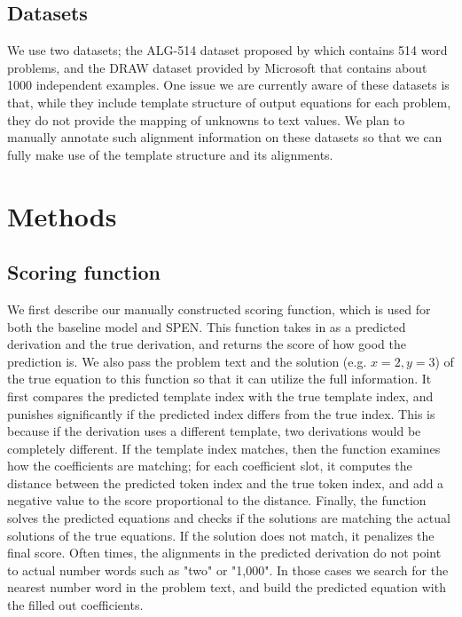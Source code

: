 \documentclass[11pt,letterpaper]{article}
\begin{document}
\subsection{Datasets}
We use two datasets; the ALG-514 dataset proposed by \cite{Kushman2014LearningTA} which contains 514 word problems, and the DRAW dataset provided by Microsoft that contains about 1000 independent examples. One issue we are currently aware of these datasets is that, while they include template structure of output equations for each problem, they do not provide the mapping of unknowns to text values. We plan to manually annotate such alignment information on these datasets so that we can fully make use of the template structure and its alignments.
\section{Methods}
\subsection{Scoring function}
We first describe our manually constructed scoring function, which is used for both the baseline model and SPEN. This function takes in as a predicted derivation and the true derivation, and returns the score of how good the prediction is. We also pass the problem text and the solution (e.g. $x=2, y=3$) of the true equation to this function so that it can utilize the full information. It first compares the predicted template index with the true template index, and punishes significantly if the predicted index differs from the true index. This is because if the derivation uses a different template, two derivations would be completely different. If the template index matches, then the function examines how the coefficients are matching; for each coefficient slot, it computes the distance between the predicted token index and the true token index, and add a negative value to the score proportional to the distance. Finally, the function solves the predicted equations and checks if the solutions are matching the actual solutions of the true equations. If the solution does not match, it penalizes the final score. Often times, the alignments in the predicted derivation do not point to actual number words such as "two" or "1,000". In those cases we search for the nearest number word in the problem text, and build the predicted equation with the filled out coefficients.
\end{document}
